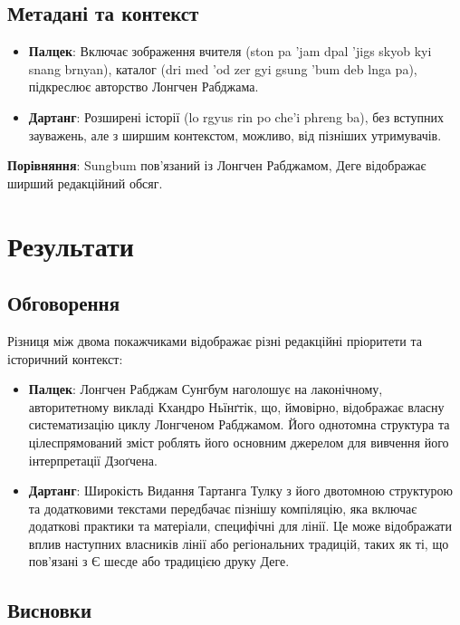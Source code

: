 \documentclass{article}
\begin{document}
\newpage
\subsection{Метадані та контекст}


\begingroup\raggedright
\begin{itemize}
    \item \textbf{Палцек}: Включає зображення вчителя (ston pa 'jam dpal 'jigs skyob kyi snang brnyan), каталог (dri med 'od zer gyi gsung 'bum deb lnga pa), підкреслює авторство Лонгчен Рабджама.
    \item \textbf{Дартанг}: Розширені історії (lo rgyus rin po che'i phreng ba), без вступних зауважень, але з ширшим контекстом, можливо, від пізніших утримувачів.
\end{itemize}
\endgroup

\textbf{Порівняння}: Sungbum пов’язаний із Лонгчен Рабджамом, Деге відображає ширший редакційний обсяг.

\section{Результати}

\subsection{Обговорення}

Різниця між двома покажчиками відображає різні редакційні пріоритети та історичний контекст:

\begingroup\raggedright
\begin{itemize}
\item \textbf{Палцек}: Лонгчен Рабджам Сунгбум наголошує на лаконічному, авторитетному викладі Кхандро Ньїнґтік, що, ймовірно, відображає власну систематизацію циклу Лонгченом Рабджамом. Його однотомна структура та цілеспрямований зміст роблять його основним джерелом для вивчення його інтерпретації Дзоґчена.
\item \textbf{Дартанг}: Широкість Видання Тартанга Тулку з його двотомною структурою та додатковими текстами передбачає пізнішу компіляцію, яка включає додаткові практики та матеріали, специфічні для лінії. Це може відображати вплив наступних власників лінії або регіональних традицій, таких як ті, що пов'язані з Є шесде або традицією друку Деге.
\end{itemize}
\endgroup

\subsection{Висновки}
\end{document}
